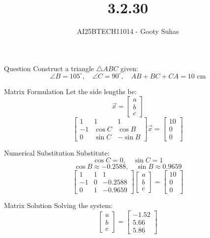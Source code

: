 \documentclass{beamer}
\title{3.2.30}
\author{AI25BTECH11014 - Gooty Suhas}
\begin{document}
\frame{\titlepage}

\begin{frame}{Question}
Construct a triangle \( \triangle ABC \) given:
\[
\angle B = 105^\circ, \quad \angle C = 90^\circ, \quad AB + BC + CA = 10 \text{ cm}
\]
\end{frame}

\begin{frame}{Matrix Formulation}
Let the side lengths be:
\[
\vec{x} = \begin{bmatrix} a \\ b \\ c \end{bmatrix}
\]
\[
\begin{bmatrix}
1 & 1 & 1 \\
-1 & \cos C & \cos B \\
0 & \sin C & -\sin B
\end{bmatrix}
\vec{x}
=
\begin{bmatrix}
10 \\
0 \\
0
\end{bmatrix}
\]
\end{frame}

\begin{frame}{Numerical Substitution}
Substitute:
\[
\cos C = 0, \quad \sin C = 1
\]
\[
\cos B \approx -0.2588, \quad \sin B \approx 0.9659
\]
\[
\begin{bmatrix}
1 & 1 & 1 \\
-1 & 0 & -0.2588 \\
0 & 1 & -0.9659
\end{bmatrix}
\begin{bmatrix}
a \\
b \\
c
\end{bmatrix}
=
\begin{bmatrix}
10 \\
0 \\
0
\end{bmatrix}
\]
\end{frame}

\begin{frame}{Matrix Solution}
Solving the system:
\[
\begin{bmatrix}
a \\
b \\
c
\end{bmatrix}
=
\begin{bmatrix}
-1.52 \\
5.66 \\
5.86
\end{bmatrix}
\]
\end{frame}
\end{document}
